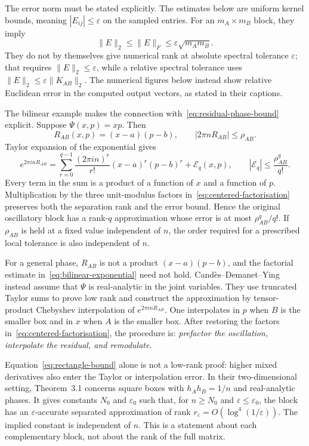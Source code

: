 The error norm must be stated explicitly. The estimates below are uniform kernel bounds, meaning $|E_{ij}|\leq\varepsilon$ on the sampled entries. For an $m_A\times m_B$ block, they imply
\begin{equation}
    \|E\|_2\leq\|E\|_F\leq\varepsilon\sqrt{m_Am_B}.
\end{equation}
They do not by themselves give numerical rank at absolute spectral tolerance $\varepsilon$; that requires $\|E\|_2\leq\varepsilon$, while a relative spectral tolerance uses $\|E\|_2\leq\varepsilon\|K_{AB}\|_2$. The numerical figures below instead show relative Euclidean error in the computed output vectors, as stated in their captions.

The bilinear example makes the connection with~\eqref{eq:residual-phase-bound} explicit. Suppose $\Psi(x,p)=xp$. Then
\begin{equation}
    R_{AB}(x,p)=(x-a)(p-b),
    \qquad
    |2\pi nR_{AB}|\leq\rho_{AB}.
\end{equation}
Taylor expansion of the exponential gives
\begin{equation}
    e^{2\pi i nR_{AB}}
    =\sum_{r=0}^{q-1}
     \frac{(2\pi i n)^r}{r!}(x-a)^r(p-b)^r
     +\mathcal{E}_q(x,p),
    \qquad
    |\mathcal{E}_q|\leq\frac{\rho_{AB}^q}{q!}.
    \label{eq:bilinear-exponential}
\end{equation}
Every term in the sum is a product of a function of $x$ and a function of $p$. Multiplication by the three unit-modulus factors in~\eqref{eq:centered-factorisation} preserves both the separation rank and the error bound. Hence the original oscillatory block has a rank-$q$ approximation whose error is at most $\rho_{AB}^q/q!$. If $\rho_{AB}$ is held at a fixed value independent of $n$, the order required for a prescribed local tolerance is also independent of $n$.

For a general phase, $R_{AB}$ is not a product $(x-a)(p-b)$, and the factorial estimate in~\eqref{eq:bilinear-exponential} need not hold. Cand\`{e}s--Demanet--Ying instead assume that $\Psi$ is real-analytic in the joint variables. They use truncated Taylor sums to prove low rank and construct the approximation by tensor-product Chebyshev interpolation of $e^{2\pi i nR_{AB}}$. One interpolates in $p$ when $B$ is the smaller box and in $x$ when $A$ is the smaller box. After restoring the factors in~\eqref{eq:centered-factorisation}, the procedure is: \emph{prefactor the oscillation, interpolate the residual, and remodulate}.

Equation~\eqref{eq:rectangle-bound} alone is not a low-rank proof: higher mixed derivatives also enter the Taylor or interpolation error. In their two-dimensional setting, Theorem~3.1 concerns square boxes with $h_Ah_B=1/n$ and real-analytic phases. It gives constants $N_0$ and $\varepsilon_0$ such that, for $n\geq N_0$ and $\varepsilon\leq\varepsilon_0$, the block has an $\varepsilon$-accurate separated approximation of rank $r_\varepsilon=O(\log^4(1/\varepsilon))$. The implied constant is independent of $n$. This is a statement about each complementary block, not about the rank of the full matrix.

